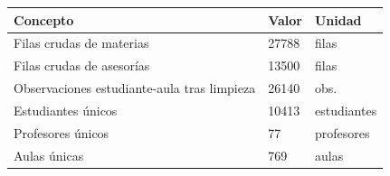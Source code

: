 \begin{tabular}{@{}lll@{}}
\toprule
Concepto & Valor & Unidad \\
\midrule
Filas crudas de materias & 27788 & filas \\
Filas crudas de asesorías & 13500 & filas \\
Observaciones estudiante-aula tras limpieza & 26140 & obs. \\
Estudiantes únicos & 10413 & estudiantes \\
Profesores únicos & 77 & profesores \\
Aulas únicas & 769 & aulas \\
\bottomrule
\end{tabular}
